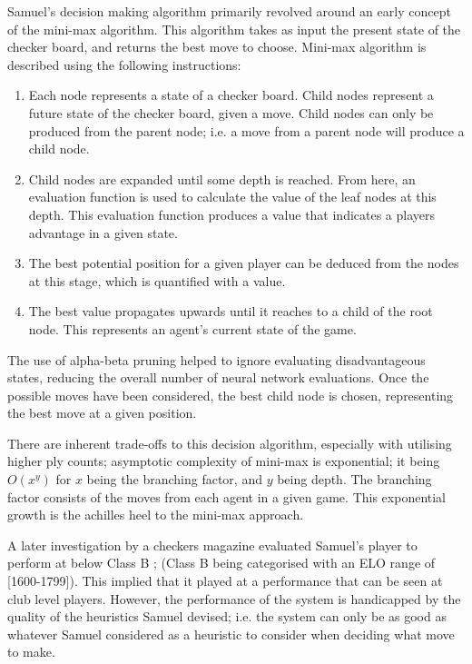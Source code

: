\documentclass[12pt,a4paper]{article}
\begin{document}
        Samuel's decision making algorithm primarily revolved around an early concept of the mini-max algorithm. This algorithm takes as input the present state of the checker board, and returns the best move to choose. Mini-max algorithm is described using the following instructions:
        
        \begin{enumerate}
            \item Each node represents a state of a checker board. Child nodes represent a future state of the checker board, given a move. Child nodes can only be produced from the parent node; i.e. a move from a parent node will produce a child node.
            \item Child nodes are expanded until some depth is reached. From here, an evaluation function is used to calculate the value of the leaf nodes at this depth. This evaluation function produces a value that indicates a players advantage in a given state.
            \item The best potential position for a given player can be deduced from the nodes at this stage, which is quantified with a value.
            \item The best value propagates upwards until it reaches to a child of the root node. This represents an agent's current state of the game.
        \end{enumerate}

        The use of alpha-beta pruning helped to ignore evaluating disadvantageous states, reducing the overall number of neural network evaluations. Once the possible moves have been considered, the best child node is chosen, representing the best move at a given position.
    
        There are inherent trade-offs to this decision algorithm, especially with utilising higher ply counts; asymptotic complexity of mini-max is exponential; it being $O(x^y)$ for $x$ being the branching factor, and $y$ being depth. The branching factor consists of the moves from each agent in a given game. This exponential growth is the achilles heel to the mini-max approach. 

        A later investigation by a checkers magazine evaluated Samuel's player to perform at below Class B \cite{schaeffer_one_1997,fogel_evolving_2000}; (Class B being categorised with an ELO range of [1600-1799]). This implied that it played at a performance that can be seen at club level players. However, the performance of the system is handicapped by the quality of the heuristics Samuel devised; i.e. the system can only be as good as whatever Samuel considered as a heuristic to consider when deciding what move to make.
\end{document}
